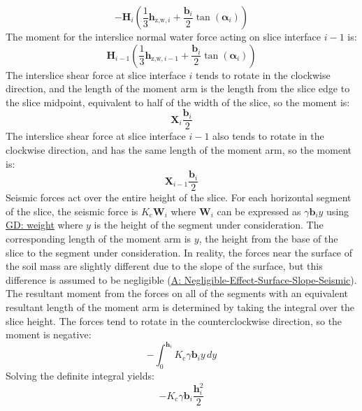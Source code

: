 \documentclass[12pt]{article}
\begin{document}
\begin{displaymath}
-{\mathbf{H}}_{i} \left(\frac{1}{3} {\mathbf{h}_{\text{z,w},i}}+\frac{{\mathbf{b}}_{i}}{2} \tan\left({\mathbf{α}}_{i}\right)\right)
\end{displaymath}
The moment for the interslice normal water force acting on slice interface $i-1$ is:
\begin{displaymath}
{\mathbf{H}}_{i-1} \left(\frac{1}{3} {\mathbf{h}_{\text{z,w},i-1}}+\frac{{\mathbf{b}}_{i}}{2} \tan\left({\mathbf{α}}_{i}\right)\right)
\end{displaymath}
The interslice shear force at slice interface $i$ tends to rotate in the clockwise direction, and the length of the moment arm is the length from the slice edge to the slice midpoint, equivalent to half of the width of the slice, so the moment is:
\begin{displaymath}
{\mathbf{X}}_{i} \frac{{\mathbf{b}}_{i}}{2}
\end{displaymath}
The interslice shear force at slice interface $i-1$ also tends to rotate in the clockwise direction, and has the same length of the moment arm, so the moment is:
\begin{displaymath}
{\mathbf{X}}_{i-1} \frac{{\mathbf{b}}_{i}}{2}
\end{displaymath}
Seismic forces act over the entire height of the slice. For each horizontal segment of the slice, the seismic force is ${K_{\text{c}}} {\mathbf{W}}_{i}$ where ${\mathbf{W}}_{i}$ can be expressed as $γ {\mathbf{b}}_{i} y$ using \hyperref[GD:weight]{GD: weight} where $y$ is the height of the segment under consideration. The corresponding length of the moment arm is $y$, the height from the base of the slice to the segment under consideration. In reality, the forces near the surface of the soil mass are slightly different due to the slope of the surface, but this difference is assumed to be negligible (\hyperref[assumpNESSS]{A: Negligible-Effect-Surface-Slope-Seismic}). The resultant moment from the forces on all of the segments with an equivalent resultant length of the moment arm is determined by taking the integral over the slice height. The forces tend to rotate in the counterclockwise direction, so the moment is negative:
\begin{displaymath}
-\int_{0}^{{\mathbf{h}}_{i}}{{K_{\text{c}}} γ {\mathbf{b}}_{i} y}\,dy
\end{displaymath}
Solving the definite integral yields:
\begin{displaymath}
-{K_{\text{c}}} γ {\mathbf{b}}_{i} \frac{{\mathbf{h}}_{i}^{2}}{2}
\end{displaymath}
\end{document}

